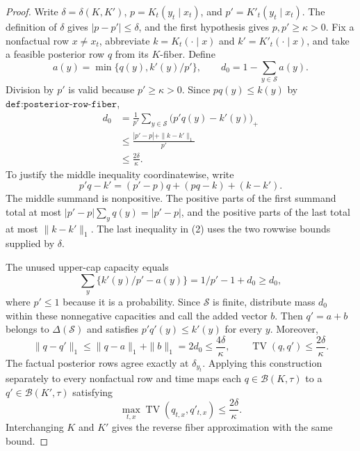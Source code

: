 \documentclass{article}
\begin{document}
\begin{proof}
Write \(\delta=\delta(K,K')\), \(p=K_t(y_t\mid x_t)\), and \(p'=K'_t(y_t\mid x_t)\).  The definition of \(\delta\) gives \(|p-p'|\le\delta\), and the first hypothesis gives \(p,p'\ge\kappa>0\).  Fix a nonfactual row \(x\ne x_t\), abbreviate \(k=K_t(\cdot\mid x)\) and \(k'=K'_t(\cdot\mid x)\), and take a feasible posterior row \(q\) from its \(K\)-fiber.  Define
\[
 a(y)=\min\{q(y),k'(y)/p'\},
 \qquad
 d_0=1-\sum_{y\in\mathcal S}a(y).
\]
Division by \(p'\) is valid because \(p'\ge\kappa>0\).  Since \(pq(y)\le k(y)\) by \(\texttt{def:posterior-row-fiber}\),
\[
\begin{aligned}
 d_0
 &=\frac1{p'}\sum_{y\in\mathcal S}\bigl(p'q(y)-k'(y)\bigr)_+\\
 &\le \frac{|p'-p|+\|k-k'\|_1}{p'}\\
 &\le \frac{2\delta}{\kappa}.
\end{aligned}
\tag{2}
\]
To justify the middle inequality coordinatewise, write
\[
 p'q-k'=(p'-p)q+(pq-k)+(k-k').
\]
The middle summand is nonpositive.  The positive parts of the first summand total at most \(|p'-p|\sum_yq(y)=|p'-p|\), and the positive parts of the last total at most \(\|k-k'\|_1\).  The last inequality in (2) uses the two rowwise bounds supplied by \(\delta\).

The unused upper-cap capacity equals
\[
 \sum_y\{k'(y)/p'-a(y)\}
 =1/p'-1+d_0
 \ge d_0,
\]
where \(p'\le1\) because it is a probability.  Since \(\mathcal S\) is finite, distribute mass \(d_0\) within these nonnegative capacities and call the added vector \(b\).  Then \(q'=a+b\) belongs to \(\Delta(\mathcal S)\) and satisfies \(p'q'(y)\le k'(y)\) for every \(y\).  Moreover,
\[
 \|q-q'\|_1
 \le \|q-a\|_1+\|b\|_1
 =2d_0
 \le\frac{4\delta}{\kappa},
 \qquad
 \operatorname{TV}(q,q')\le\frac{2\delta}{\kappa}.
 \tag{3}
\]
The factual posterior rows agree exactly at \(\delta_{y_t}\).  Applying this construction separately to every nonfactual row and time maps each \(q\in\mathcal B(K,\tau)\) to a \(q'\in\mathcal B(K',\tau)\) satisfying
\[
 \max_{t,x}\operatorname{TV}(q_{t,x},q'_{t,x})
 \le\frac{2\delta}{\kappa}.
 \tag{4}
\]
Interchanging \(K\) and \(K'\) gives the reverse fiber approximation with the same bound.


\end{proof}
\end{document}
